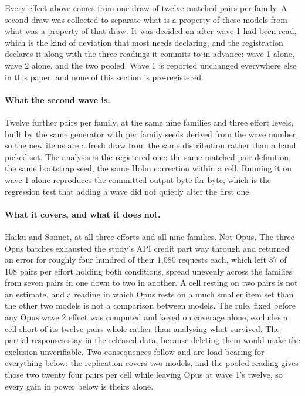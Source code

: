 \label{sec:replication}\label{app:replication}
Every effect above comes from one draw of twelve matched pairs per family. A
second draw was collected to separate what is a property of these models from
what was a property of that draw. It was decided on after wave 1 had been
read, which is the kind of deviation that most needs declaring, and the
registration declares it along with the three readings it commits to in
advance: wave 1 alone, wave 2 alone, and the two pooled. Wave 1 is reported
unchanged everywhere else in this paper, and none of this section is
pre-registered.

\paragraph{What the second wave is.} Twelve further pairs per family, at the
same nine families and three effort levels, built by the same generator with
per family seeds derived from the wave number, so the new items are a fresh
draw from the same distribution rather than a hand picked set. The analysis
is the registered one: the same matched pair definition, the same bootstrap
seed, the same Holm correction within a cell. Running it on wave 1 alone
reproduces the committed output byte for byte, which is the regression test
that adding a wave did not quietly alter the first one.

\paragraph{What it covers, and what it does not.} Haiku and Sonnet, at all
three efforts and all nine families. Not Opus. The three Opus batches
exhausted the study's API credit part way through and returned an error for
roughly four hundred of their 1{,}080 requests each, which left 37 of 108
pairs per effort holding both conditions, spread unevenly across the families
from seven pairs in one down to two in another. A cell resting on two pairs
is not an estimate, and a reading in which Opus rests on a much smaller item
set than the other two models is not a comparison between models. The rule,
fixed before any Opus wave 2 effect was computed and keyed on coverage alone,
excludes a cell short of its twelve pairs whole rather than analysing what
survived. The partial responses stay in the released data, because deleting
them would make the exclusion unverifiable. Two consequences follow and are
load bearing for everything below: the replication covers two models, and the
pooled reading gives those two twenty four pairs per cell while leaving Opus
at wave 1's twelve, so every gain in power below is theirs alone.

